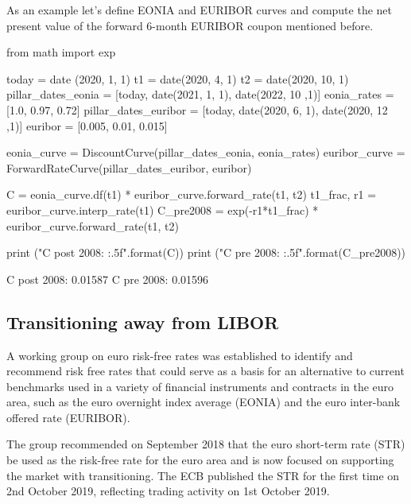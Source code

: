%
%

As an example let's define EONIA and EURIBOR curves and compute the net present value of the forward 6-month EURIBOR coupon mentioned before.

\begin{ipython}
from math import exp

today = date (2020, 1, 1)
t1 = date(2020, 4, 1)
t2 = date(2020, 10, 1)
pillar_dates_eonia = [today, date(2021, 1, 1), date(2022, 10 ,1)] 
eonia_rates = [1.0, 0.97, 0.72]
pillar_dates_euribor = [today, date(2020, 6, 1), date(2020, 12 ,1)] 
euribor = [0.005, 0.01, 0.015]

eonia_curve = DiscountCurve(pillar_dates_eonia, eonia_rates) 
euribor_curve = ForwardRateCurve(pillar_dates_euribor, euribor) 

C = eonia_curve.df(t1) * euribor_curve.forward_rate(t1, t2)
t1_frac, r1 = euribor_curve.interp_rate(t1)
C_pre2008 = exp(-r1*t1_frac) * euribor_curve.forward_rate(t1, t2)

print ("C post 2008: {:.5f}".format(C))
print ("C pre 2008: {:.5f}".format(C_pre2008))
\end{ipython}
\begin{ioutput}
C post 2008: 0.01587
C pre 2008: 0.01596
\end{ioutput}

\subsection{Transitioning away from LIBOR~\cite{bib:str}}
A working group on euro risk-free rates was established to identify and recommend risk free rates that could serve as a basis for an alternative to current benchmarks used in a variety of financial instruments and contracts in the euro area, such as the euro overnight index average (EONIA) and the euro inter-bank offered rate (EURIBOR). 

The group recommended on September 2018 that the euro short-term rate (STR) be used as the risk-free rate for the euro area and is now focused on supporting the market with transitioning.
The ECB published the STR for the first time on 2nd October 2019, reflecting trading activity on 1st October 2019.

